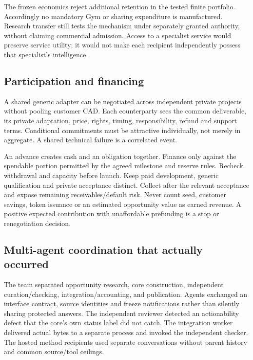 \documentclass[
  11pt,
]{article}
\let\OriginalSubsection\subsection
\renewcommand{\subsection}{\needspace{6\baselineskip}\OriginalSubsection}
\begin{document}
The frozen economics reject additional retention in the tested finite
portfolio. Accordingly no mandatory Gym or sharing expenditure is
manufactured. Research transfer still tests the mechanism under
separately granted authority, without claiming commercial admission.
Access to a specialist service would preserve service utility; it would
not make each recipient independently possess that specialist's
intelligence.

\hypertarget{participation-and-financing}{%
\subsection{Participation and
financing}\label{participation-and-financing}}

A shared generic adapter can be negotiated across independent private
projects without pooling customer CAD. Each counterparty sees the common
deliverable, its private adaptation, price, rights, timing,
responsibility, refund and support terms. Conditional commitments must
be attractive individually, not merely in aggregate. A shared technical
failure is a correlated event.

An advance creates cash and an obligation together. Finance only against
the spendable portion permitted by the agreed milestone and reserve
rules. Recheck withdrawal and capacity before launch. Keep paid
development, generic qualification and private acceptance distinct.
Collect after the relevant acceptance and expose remaining
receivables/default risk. Never count seed, customer savings, token
issuance or an estimated opportunity value as earned revenue. A positive
expected contribution with unaffordable prefunding is a stop or
renegotiation decision.

\hypertarget{multi-agent-coordination-that-actually-occurred}{%
\subsection{Multi-agent coordination that actually
occurred}\label{multi-agent-coordination-that-actually-occurred}}

The team separated opportunity research, core construction, independent
curation/checking, integration/accounting, and publication. Agents
exchanged an interface contract, source identities and freeze
notifications rather than silently sharing protected answers. The
independent reviewer detected an actionability defect that the core's
own status label did not catch. The integration worker delivered actual
bytes to a separate process and invoked the independent checker. The
hosted method recipients used separate conversations without parent
history and common source/tool ceilings.
\end{document}
